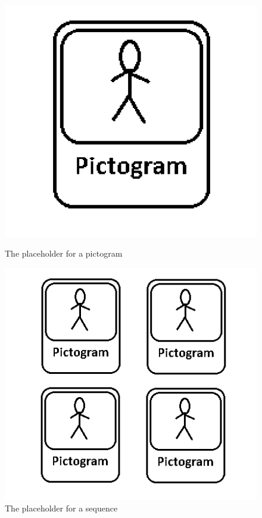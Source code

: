 \begin{figure} [h!]
\centering
\begin{minipage}{.3\textwidth}
\centering
\includegraphics[scale=0.5]{Pics/Sprint3/placeholders/PLACEHOLDER_PICTOGRAM.png}
\caption{The placeholder for a pictogram}
\label{fig:placePictogram}
\end{minipage}\hfill
\begin{minipage}{.3\textwidth}
\centering
\includegraphics[scale=0.5]{Pics/Sprint3/placeholders/PLACEHOLDER_SEQUENCE.png}
\caption{The placeholder for a sequence}
\label{fig:placeSequence}
\end{minipage}\hfill

\end{figure}
